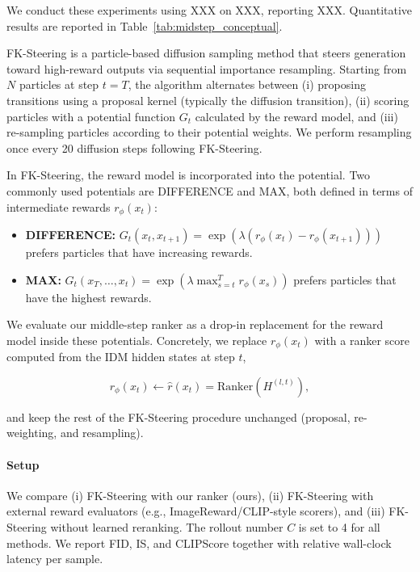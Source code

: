 \documentclass{article}
\begin{document}
We conduct these experiments using XXX on XXX, reporting XXX. Quantitative results are reported in Table~\ref{tab:midstep_conceptual}.

FK-Steering is a particle-based diffusion sampling method that steers generation toward high-reward outputs via sequential importance resampling. Starting from $N$ particles at step $t = T$, the algorithm alternates between (i) proposing transitions using a proposal kernel (typically the diffusion transition), (ii) scoring particles with a potential function $G_{t}$ calculated by the reward model, and (iii) re-sampling particles according to their potential weights. We perform resampling once every 20 diffusion steps following FK-Steering.

In FK-Steering, the reward model is incorporated into the potential. Two commonly used potentials are DIFFERENCE and MAX, both defined in terms of intermediate rewards $r_{\phi}(x_{t})$:

\begin{itemize}
    \item \textbf{DIFFERENCE:} $G_{t}(x_{t},x_{t+1}) = \exp(\lambda(r_{\phi}(x_{t}) - r_{\phi}(x_{t+1})))$ prefers particles that have increasing rewards.
    \item \textbf{MAX:} $G_{t}(x_{T},\ldots,x_{t}) = \exp(\lambda\max_{s=t}^{T}r_{\phi}(x_{s}))$ prefers particles that have the highest rewards.
\end{itemize}

We evaluate our middle-step ranker as a drop-in replacement for the reward model inside these potentials. Concretely, we replace $r_{\phi}(x_{t})$ with a ranker score computed from the IDM hidden states at step $t$,

\begin{equation}
    r_{\phi}(x_{t}) \leftarrow \hat{r}(x_{t}) = \text{Ranker}(H^{(l,t)}),
\end{equation}

and keep the rest of the FK-Steering procedure unchanged (proposal, re-weighting, and resampling).

\paragraph{Setup}
We compare (i) FK-Steering with our ranker (ours), (ii) FK-Steering with external reward evaluators (e.g., ImageReward/CLIP-style scorers), and (iii) FK-Steering without learned reranking. The rollout number \(C\) is set to 4 for all methods. We report FID, IS, and CLIPScore together with relative wall-clock latency per sample.
\end{document}
